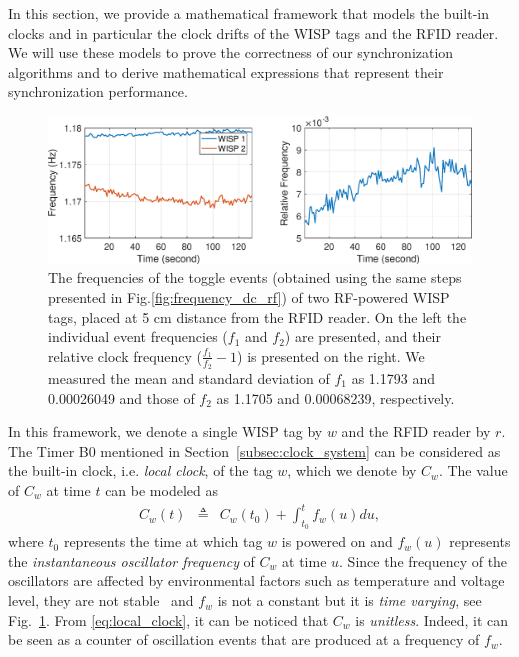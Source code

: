 \documentclass[journal,draftcls,onecolumn,12pt,twoside]{IEEEtranTCOM}
\begin{document}
In this section, we provide a mathematical framework that models the built-in clocks and in particular the clock drifts of the WISP tags and the RFID reader. We will use these models to prove the correctness of our synchronization algorithms and to derive mathematical expressions that represent their synchronization performance.
\begin{figure}
\centering
\includegraphics[scale=0.35] {figures/relative_clock_frequency.eps}
\caption{\label{fig:frequency}The frequencies of the toggle events (obtained using the same steps presented in Fig.\ref{fig:frequency_dc_rf}) of two RF-powered WISP tags, placed at 5 cm distance from the RFID reader. On the left the individual event frequencies ($f_1$ and $f_2$) are presented, and their relative clock frequency ($\frac{f_1}{f_2}-1$) is presented on the right. We measured the mean and standard deviation of $f_1$ as 1.1793 and 0.00026049 and those of $f_2$ as 1.1705 and  0.00068239, respectively.}
\end{figure}
In this framework, we denote a single WISP tag by $w$ and the RFID reader by $r$. The Timer B0 mentioned in Section~\ref{subsec:clock_system} can be considered as the built-in clock, i.e. \emph{local clock}, of the tag $w$, 
which we denote by $C_{w}$. The value of $C_{w}$ at time $t$ can be modeled as
%
\begin{eqnarray}
C_{w}(t) & \triangleq & C_w(t_0)+ \int_{t_0}^{t}f_{w}(u)du, 
\label{eq:local_clock}
\end{eqnarray}
%
where $t_0$ represents the time at which tag $w$ is powered on and  $f_{w}(u)$ represents the \emph{instantaneous oscillator frequency} of $C_{w}$ at time $u$. Since the frequency of the oscillators are affected by environmental factors such as temperature and voltage level, they are not stable~\cite{Lenzen2009Optimal} and $f_{w}$ is not a constant but it is \emph{time varying}, see Fig.~\ref{fig:frequency}. From \eqref{eq:local_clock}, it can be noticed that $C_w$ is \emph{unitless}. Indeed, it can be seen as a counter of oscillation events that are produced at a frequency of $f_w$.
\end{document}
